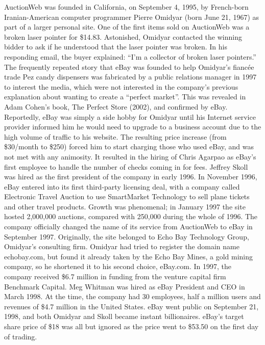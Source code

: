 AuctionWeb was founded in California, on September 4, 1995, by French-born Iranian-American computer programmer Pierre Omidyar (born June 21, 1967) as part of a larger personal site. One of the first items sold on AuctionWeb was a broken laser pointer for \$14.83. Astonished, Omidyar contacted the winning bidder to ask if he understood that the laser pointer was broken. In his responding email, the buyer explained: “I'm a collector of broken laser pointers.” The frequently repeated story that eBay was founded to help Omidyar's fiancée trade Pez candy dispensers was fabricated by a public relations manager in 1997 to interest the media, which were not interested in the company's previous explanation about wanting to create a “perfect market”. This was revealed in Adam Cohen's book, The Perfect Store (2002), and confirmed by eBay.
Reportedly, eBay was simply a side hobby for Omidyar until his Internet service provider informed him he would need to upgrade to a business account due to the high volume of traffic to his website. The resulting price increase (from \$30/month to \$250) forced him to start charging those who used eBay, and was not met with any animosity. It resulted in the hiring of Chris Agarpao as eBay's first employee to handle the number of checks coming in for fees.
Jeffrey Skoll was hired as the first president of the company in early 1996. In November 1996, eBay entered into its first third-party licensing deal, with a company called Electronic Travel Auction to use SmartMarket Technology to sell plane tickets and other travel products. Growth was phenomenal; in January 1997 the site hosted 2,000,000 auctions, compared with 250,000 during the whole of 1996. The company officially changed the name of its service from AuctionWeb to eBay in September 1997. Originally, the site belonged to Echo Bay Technology Group, Omidyar's consulting firm. Omidyar had tried to register the domain name echobay.com, but found it already taken by the Echo Bay Mines, a gold mining company, so he shortened it to his second choice, eBay.com.
In 1997, the company received \$6.7 million in funding from the venture capital firm Benchmark Capital.
Meg Whitman was hired as eBay President and CEO in March 1998. At the time, the company had 30 employees, half a million users and revenues of \$4.7 million in the United States.
eBay went public on September 21, 1998, and both Omidyar and Skoll became instant billionaires. eBay's target share price of \$18 was all but ignored as the price went to \$53.50 on the first day of trading.